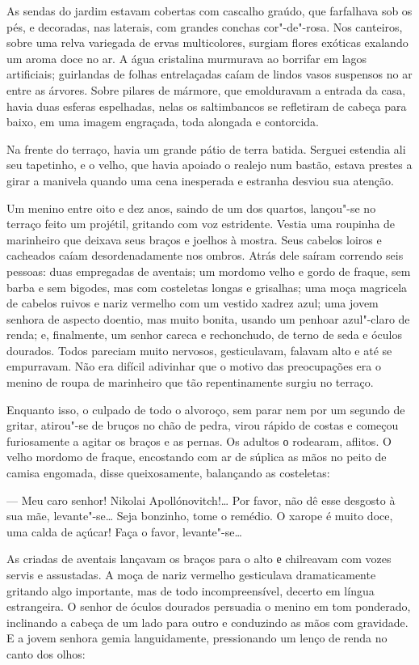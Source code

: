 As sendas do jardim estavam cobertas com cascalho graúdo, que farfalhava
sob os pés, e decoradas, nas laterais, com grandes conchas cor"-de"-rosa.
Nos canteiros, sobre uma relva variegada de ervas multicolores, surgiam
flores exóticas exalando um aroma doce no ar. A água cristalina
murmurava ao borrifar em lagos artificiais; guirlandas de folhas
entrelaçadas caíam de lindos vasos suspensos no ar entre as árvores. Sobre pilares de mármore, que emolduravam a entrada da casa, havia duas
esferas espelhadas, nelas os saltimbancos se refletiram de
cabeça para baixo, em uma imagem engraçada, toda alongada e contorcida.

Na frente do terraço, havia um grande pátio de terra batida. Serguei
estendia ali seu tapetinho, e o velho, que havia apoiado o realejo num
bastão, estava prestes a girar a manivela quando uma cena inesperada e
estranha desviou sua atenção.

Um menino entre oito e dez anos, saindo de um dos quartos, lançou"-se no
terraço feito um projétil, gritando com voz estridente. Vestia uma
roupinha de marinheiro que deixava seus braços e joelhos à mostra. Seus
cabelos loiros e cacheados caíam desordenadamente nos ombros. Atrás dele
saíram correndo seis pessoas: duas empregadas de aventais; um mordomo velho e
gordo de fraque, sem barba e sem bigodes, mas com costeletas
longas e grisalhas; uma moça magricela de cabelos ruivos e nariz
vermelho com um vestido xadrez azul; uma jovem senhora de aspecto
doentio, mas muito bonita, usando um penhoar azul"-claro de renda; e,
finalmente, um senhor careca e rechonchudo, de terno de seda e óculos
dourados. Todos pareciam muito nervosos, gesticulavam, falavam alto e
até se empurravam. Não era difícil adivinhar que o motivo das
preocupações era o menino de roupa de marinheiro que tão repentinamente
surgiu no terraço.

Enquanto isso, o culpado de todo o alvoroço, sem parar nem por um
segundo de gritar, atirou"-se de bruços no chão de pedra, virou rápido de
costas e começou furiosamente a agitar os braços e as pernas. Os adultos
о rodearam, aflitos. O velho mordomo de fraque, encostando com ar de
súplica as mãos no peito de camisa engomada, disse queixosamente,
balançando as costeletas:

--- Meu caro senhor! Nikolai Apollónovitch!\ldots{} Por favor, não dê esse
desgosto à sua mãe, levante"-se\ldots{} Seja bonzinho, tome o remédio. O
xarope é muito doce, uma calda de açúcar! Faça o favor, levante"-se\ldots{}

As criadas de aventais lançavam os braços para o alto е chilreavam com
vozes servis e assustadas. A moça de nariz vermelho gesticulava
dramaticamente gritando algo importante, mas de todo incompreensível, decerto em língua estrangeira. O senhor de óculos
dourados persuadia o menino em tom ponderado, inclinando a cabeça de um
lado para outro e conduzindo as mãos com gravidade. E a jovem senhora
gemia languidamente, pressionando um lenço de renda no canto dos olhos:

